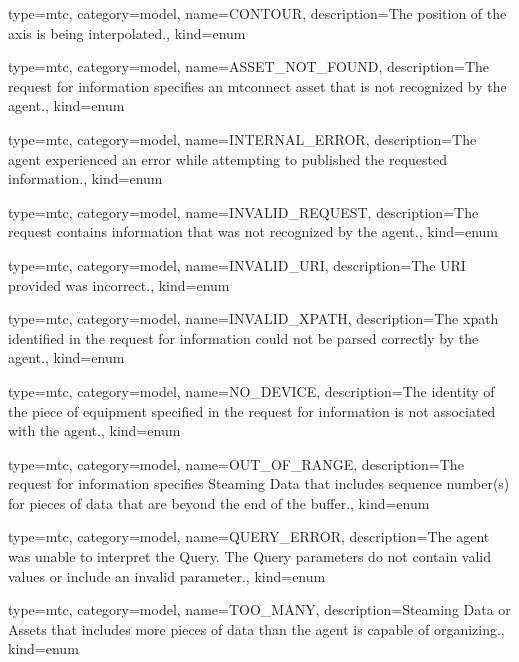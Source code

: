 {
  type=mtc,
  category=model,
  name={CONTOUR},
  description={The position of the axis is being interpolated.},
  kind={enum}
}


{
  type=mtc,
  category=model,
  name={ASSET\_NOT\_FOUND},
  description={The \gls{request} for information specifies an \gls{mtconnect asset} that is not recognized by the \gls{agent}.},
  kind={enum}
}

{
  type=mtc,
  category=model,
  name={INTERNAL\_ERROR},
  description={The \gls{agent} experienced an error while attempting to published the requested information.},
  kind={enum}
}


{
  type=mtc,
  category=model,
  name={INVALID\_REQUEST},
  description={The \gls{request} contains information that was not recognized by the \gls{agent}.},
  kind={enum}
}


{
  type=mtc,
  category=model,
  name={INVALID\_URI},
  description={The URI provided was incorrect.},
  kind={enum}
}

{
  type=mtc,
  category=model,
  name={INVALID\_XPATH},
  description={The \gls{xpath} identified in the \gls{request} for information could not be parsed correctly by the \gls{agent}.},
  kind={enum}
}

{
  type=mtc,
  category=model,
  name={NO\_DEVICE},
  description={The identity of the piece of equipment specified in the \gls{request} for information is not associated with the \gls{agent}.},
  kind={enum}
}

{
  type=mtc,
  category=model,
  name={OUT\_OF\_RANGE},
  description={The \gls{request} for information specifies Steaming Data that includes sequence number(s) for pieces of data that are beyond the end of the buffer.},
  kind={enum}
}


{
  type=mtc,
  category=model,
  name={QUERY\_ERROR},
  description={The \gls{agent} was unable to interpret the Query.  The Query parameters do not contain valid values or include an invalid parameter.},
  kind={enum}
}

{
  type=mtc,
  category=model,
  name={TOO\_MANY},
  description={Steaming Data or Assets that includes more pieces of data than the \gls{agent} is capable of organizing.},
  kind={enum}
}

